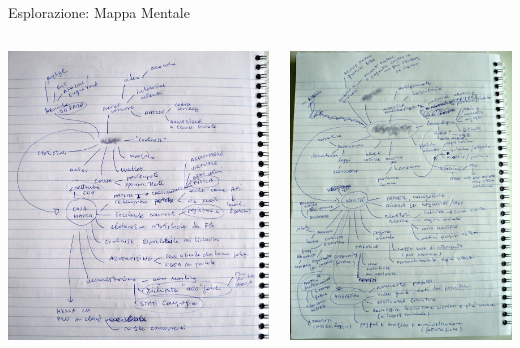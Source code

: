 \documentclass[compress, red, 14pt, pdf]{beamer}
\begin{document}
	\begin{frame}{Esplorazione: Mappa Mentale}
		\begin{columns}[T]
		    \begin{column}{.5\textwidth}
				\includegraphics[scale=0.17]{images/mindmap-2}
		    \end{column}
		    \begin{column}{.5\textwidth}
				\includegraphics[scale=0.16]{images/mindmap-3}

\end{column}
\end{columns}
\end{frame}
\end{document}
